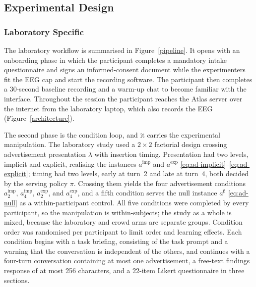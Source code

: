 \documentclass[english]{article}
\begin{document}
\subsection{Experimental Design}

\subsubsection{Laboratory Specific}
\color{black}

The laboratory workflow is summarised in Figure~\ref{pipeline}. It opens with an onboarding phase in which the participant completes a mandatory intake questionnaire and signs an informed-consent document while the experimenters fit the EEG cap and start the recording software. The participant then completes a 30-second baseline recording and a warm-up chat to become familiar with the interface. Throughout the session the participant reaches the Atlas server over the internet from the laboratory laptop, which also records the EEG (Figure~\ref{architecture}).

The second phase is the condition loop, and it carries the experimental manipulation. The laboratory study used a \(2\times 2\) factorial design crossing advertisement presentation \(\lambda\) with insertion timing. Presentation had two levels, implicit and explicit, realising the instances \(a^{\mathrm{imp}}\) and \(a^{\mathrm{exp}}\) \eqref{eq:ad-implicit}--\eqref{eq:ad-explicit}; timing had two levels, early at turn~2 and late at turn~4, both decided by the serving policy \(\pi\). Crossing them yields the four advertisement conditions \(a^{\mathrm{imp}}_2\), \(a^{\mathrm{imp}}_4\), \(a^{\mathrm{exp}}_2\), and \(a^{\mathrm{exp}}_4\), and a fifth condition serves the null instance \(a^{\emptyset}\) \eqref{eq:ad-null} as a within-participant control. All five conditions were completed by every participant, so the manipulation is within-subjects; the study as a whole is mixed, because the laboratory and crowd arms are separate groups. Condition order was randomised per participant to limit order and learning effects. Each condition begins with a task briefing, consisting of the task prompt and a warning that the conversation is independent of the others, and continues with a four-turn conversation containing at most one advertisement, a free-text findings response of at most 256 characters, and a 22-item Likert questionnaire in three sections.
\end{document}
